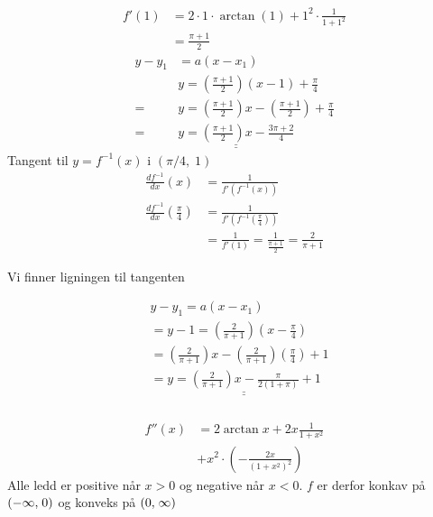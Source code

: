 \documentclass[defaultpackages]{cheatsheet}
\def\doubleunderline#1{\underline{\underline{#1}}}
\begin{document}
\begin{align*}
	f'(1) &= 2\cdot1\cdot \arctan(1) + 1^2 \cdot \frac{1}{1+1^2}\\
	&=\frac{\pi+1}{2}
\end{align*}
\begin{align*}
	y-y_1 &= a(x-x_1)\\
	&y = \left(\frac{\pi+1}{2}\right) (x-1) + \frac{\pi}{4}\\
	=&y= \left(\frac{\pi+1}{2}\right) x - \left(\frac{\pi+1}{2}\right) + \frac{\pi}{4}\\
	=&\doubleunderline{y= \left(\frac{\pi+1}{2}\right) x - \frac{3\pi+2}{4}}
\end{align*}
Tangent til $y=f^{-1}(x)$ i $(\pi/4,\;1)$
\begin{align*}
\frac{d f^{-1}}{dx} (x) &= \frac{1}{f'(f^{-1}(x))}\\
\frac{d f^{-1}}{dx} \left(\frac{\pi}{4}\right) &= \frac{1}{f'(f^{-1}(\frac{\pi}{4}))}\\
&= \frac{1}{f'(1)} = \frac{1}{\frac{\pi+1}{2}}= \frac{2}{\pi+1}
\end{align*}

Vi finner ligningen til tangenten

\begin{align*}
		&y-y_1 = a(x-x_1)\\
		&= y - 1 = \left(\frac{2}{\pi+1}\right)\left(x-\frac{\pi}{4}\right)\\
		&= \left(\frac{2}{\pi+1}\right) x - \left(\frac{2}{\pi+1}\right) \left(\frac{\pi}{4}\right) + 1\\
		&= \doubleunderline{y = \left(\frac{2}{\pi+1}\right) x - \frac{\pi}{2(1+\pi)} + 1}
\end{align*}

\subsubsection{}
\begin{align*}
	f''(x) &= 2 \arctan x + 2x \frac{1}{1+x^2} \\
	&+ x^2 \cdot \left(-\frac{2x}{(1+x^2)^2}\right)
\end{align*}
Alle ledd er positive når $x>0$ og negative når $x<0$. $f$ er derfor konkav på $\interval({-\infty,\;0})$ og konveks på $\interval({0,\;\infty})$
\subsection{}
\end{document}
